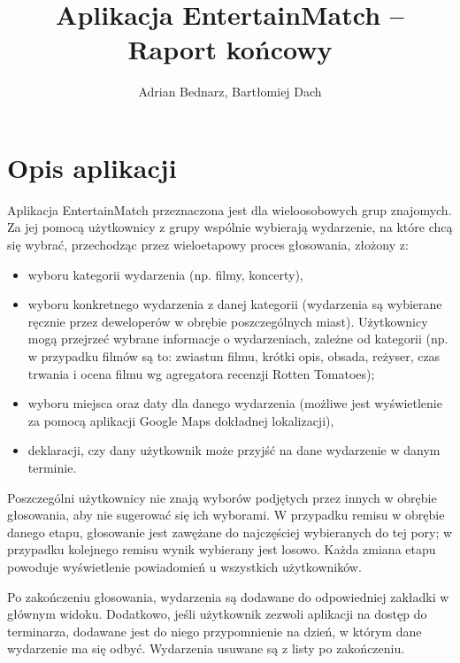 \documentclass[10pt,a4paper]{article}
\title{Aplikacja EntertainMatch -- Raport końcowy}
\author{Adrian Bednarz, Bartłomiej Dach}
\begin{document}
\maketitle

\section{Opis aplikacji}

Aplikacja EntertainMatch przeznaczona jest dla wieloosobowych grup znajomych.
Za jej pomocą użytkownicy z grupy wspólnie wybierają wydarzenie, na które chcą się wybrać,
przechodząc przez wieloetapowy proces głosowania, złożony z:

\begin{itemize}
	\item wyboru kategorii wydarzenia (np. filmy, koncerty),
	\item wyboru konkretnego wydarzenia z danej kategorii (wydarzenia są wybierane ręcznie przez
		deweloperów w obrębie poszczególnych miast). Użytkownicy mogą przejrzeć wybrane
		informacje o wydarzeniach, zależne od kategorii (np. w przypadku filmów są to:
		zwiastun filmu, krótki opis, obsada, reżyser, czas trwania i ocena filmu wg agregatora
		recenzji Rotten Tomatoes);
	\item wyboru miejsca oraz daty dla danego wydarzenia (możliwe jest wyświetlenie za pomocą
		aplikacji Google Maps dokładnej lokalizacji),
	\item deklaracji, czy dany użytkownik może przyjść na dane wydarzenie w danym terminie.
\end{itemize}

Poszczególni użytkownicy nie znają wyborów podjętych przez innych w obrębie głosowania, aby nie
sugerować się ich wyborami.
W przypadku remisu w obrębie danego etapu, głosowanie jest zawężane do najczęściej wybieranych
do tej pory; w przypadku kolejnego remisu wynik wybierany jest losowo.
Każda zmiana etapu powoduje wyświetlenie powiadomień u wszystkich użytkowników.

Po zakończeniu głosowania, wydarzenia są dodawane do odpowiedniej zakładki w głównym widoku.
Dodatkowo, jeśli użytkownik zezwoli aplikacji na dostęp do terminarza, dodawane jest do niego
przypomnienie na dzień, w którym dane wydarzenie ma się odbyć. Wydarzenia usuwane są z listy po
zakończeniu.
\end{document}

